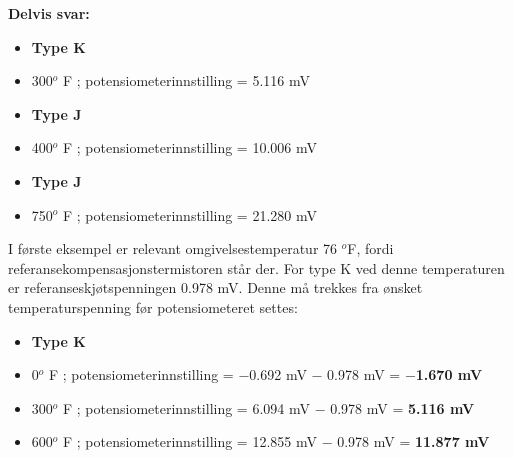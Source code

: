 





\noindent
{\bf Delvis svar:}

\begin{itemize}
\item{} {\bf Type K}
\item{} 300$^{o}$ F ; potensiometerinnstilling = 5.116 mV
\end{itemize}

\vskip 10pt

\begin{itemize}
\item{} {\bf Type J}
\item{} 400$^{o}$ F ; potensiometerinnstilling = 10.006 mV
\end{itemize}

\vskip 10pt

\begin{itemize}
\item{} {\bf Type J}
\item{} 750$^{o}$ F ; potensiometerinnstilling = 21.280 mV
\end{itemize}







I første eksempel er relevant omgivelsestemperatur 76 $^{o}$F, fordi referansekompensasjonstermistoren står der. For type K ved denne temperaturen er referanseskjøtspenningen 0.978 mV. Denne må trekkes fra ønsket temperaturspenning før potensiometeret settes:

\begin{itemize}
\item{} {\bf Type K}
\item{} 0$^{o}$ F ; potensiometerinnstilling = $-$0.692 mV $-$ 0.978 mV = {\bf $-$1.670 mV}
\item{} 300$^{o}$ F ; potensiometerinnstilling = 6.094 mV $-$ 0.978 mV = {\bf 5.116 mV}
\item{} 600$^{o}$ F ; potensiometerinnstilling = 12.855 mV $-$ 0.978 mV = {\bf 11.877 mV}
\end{itemize}

